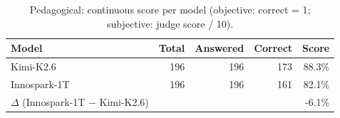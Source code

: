 \begin{table}[H]
  \centering
  \begin{tabular}{l r r r r}
    \toprule
    \textbf{Model} & \textbf{Total} & \textbf{Answered} & \textbf{Correct} & \textbf{Score} \\
    \midrule
    Kimi-K2.6 & 196 & 196 & 173 & 88.3\% \\
    Innospark-1T & 196 & 196 & 161 & 82.1\% \\
    \midrule
    $\Delta$ (Innospark-1T $-$ Kimi-K2.6) & & & & -6.1\% \\
    \bottomrule
  \end{tabular}
  \caption{Pedagogical: continuous score per model (objective: correct = 1; subjective: judge score / 10).}
  \label{tab:cat_pedagogical}
\end{table}